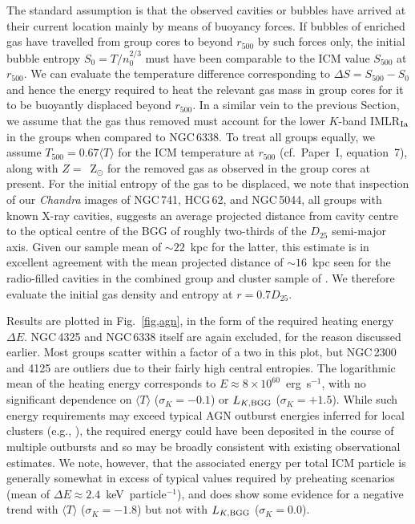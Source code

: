 \documentclass[useAMS,usenatbib]{mn2e}
\begin{document}
The standard assumption is that the observed cavities or bubbles have
arrived at their current location mainly by means of buoyancy
forces. If bubbles of enriched gas have travelled from group cores to
beyond $r_{500}$ by such forces only, the initial bubble entropy
$S_0=T/n_0^{2/3}$ must have been comparable to the ICM value $S_{500}$
at $r_{500}$.  We can evaluate the temperature difference
corresponding to $\Delta S = S_{500} - S_0$ and hence the energy
required to heat the relevant gas mass in group cores for it to be
buoyantly displaced beyond $r_{500}$.  In a similar vein to the
previous Section, we assume that the gas thus removed must account for
the lower $K$-band IMLR$_{\rm Ia}$ in the groups when compared to
NGC\,6338. To treat all groups equally, we assume $T_{500} = 0.67
\langle T\rangle$ for the ICM temperature at $r_{500}$ (cf.\ Paper~I,
equation~7), along with $Z=$~Z$_\odot$ for the removed gas as observed
in the group cores at present. For the initial entropy of the gas to
be displaced, we note that inspection of our {\em Chandra} images of
NGC\,741, HCG\,62, and NGC\,5044, all groups with known X-ray
cavities, suggests an average projected distance from cavity centre to
the optical centre of the BGG of roughly two-thirds of the $D_{25}$
semi-major axis. Given our sample mean of $\sim 22$~kpc for the
latter, this estimate is in excellent agreement with the mean
projected distance of $\sim 16$~kpc seen for the radio-filled cavities
in the combined group and cluster sample of \citet[see also
\citealt{raff06}]{birz04}. We therefore evaluate the initial gas
density and entropy at $r=0.7D_{25}$.

Results are plotted in Fig.~\ref{fig,agn}, in the form of the required
heating energy $\Delta E$. NGC\,4325 and NGC\,6338 itself are again
excluded, for the reason discussed earlier.  Most groups scatter
within a factor of a two in this plot, but NGC\,2300 and 4125 are
outliers due to their fairly high central entropies. The logarithmic
mean of the heating energy corresponds to $E\approx 8\times
10^{60}$~erg~s$^{-1}$, with no significant dependence on $\langle
T\rangle$ ($\sigma_K = -0.1$) or $L_{K,\rm BGG}$ ($\sigma_K =
+1.5$). While such energy requirements may exceed typical AGN outburst
energies inferred for local clusters (e.g., \citealt{raff06}), the
required energy could have been deposited in the course of multiple
outbursts and so may be broadly consistent with existing observational
estimates. We note, however, that the associated energy per total ICM
particle is generally somewhat in excess of typical values required by
preheating scenarios (mean of $\Delta E\approx
2.4$~keV~particle$^{-1}$), and does show some evidence for a negative
trend with $\langle T\rangle$ ($\sigma_K = -1.8$) but not with
$L_{K,\rm BGG}$ ($\sigma_K = 0.0$).
\end{document}
